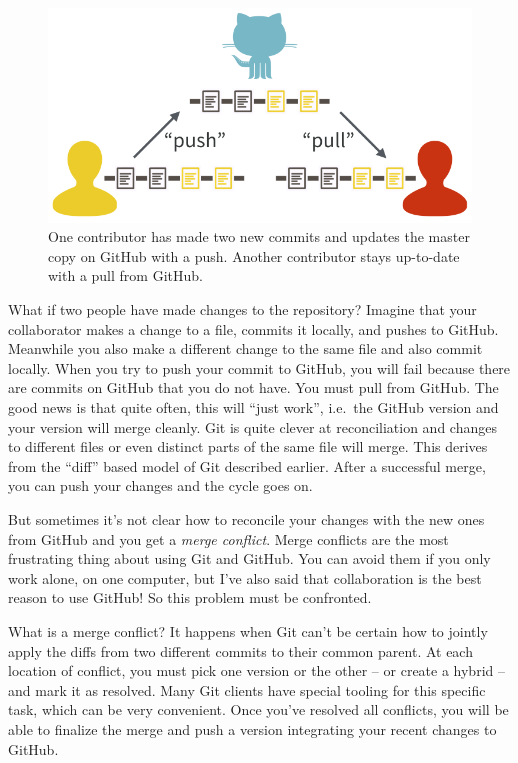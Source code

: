 \documentclass[12pt]{article}
\begin{document}
\begin{figure}
\includegraphics[width=1\linewidth]{push-pull} \caption{\label{fig:push-pull}One contributor has made two new commits and updates the master copy on GitHub with a push. Another contributor stays up-to-date with a pull from GitHub.}\label{fig:push-pull}
\end{figure}

What if two people have made changes to the repository? Imagine that
your collaborator makes a change to a file, commits it locally, and
pushes to GitHub. Meanwhile you also make a different change to the same
file and also commit locally. When you try to push your commit to
GitHub, you will fail because there are commits on GitHub that you do
not have. You must pull from GitHub. The good news is that quite often,
this will ``just work'', i.e.~the GitHub version and your version will
merge cleanly. Git is quite clever at reconciliation and changes to
different files or even distinct parts of the same file will merge. This
derives from the ``diff'' based model of Git described earlier. After a
successful merge, you can push your changes and the cycle goes on.

But sometimes it's not clear how to reconcile your changes with the new
ones from GitHub and you get a \emph{merge conflict}. Merge conflicts
are the most frustrating thing about using Git and GitHub. You can avoid
them if you only work alone, on one computer, but I've also said that
collaboration is the best reason to use GitHub! So this problem must be
confronted.

What is a merge conflict? It happens when Git can't be certain how to
jointly apply the diffs from two different commits to their common
parent. At each location of conflict, you must pick one version or the
other -- or create a hybrid -- and mark it as resolved. Many Git clients
have special tooling for this specific task, which can be very
convenient. Once you've resolved all conflicts, you will be able to
finalize the merge and push a version integrating your recent changes to
GitHub.
\end{document}
